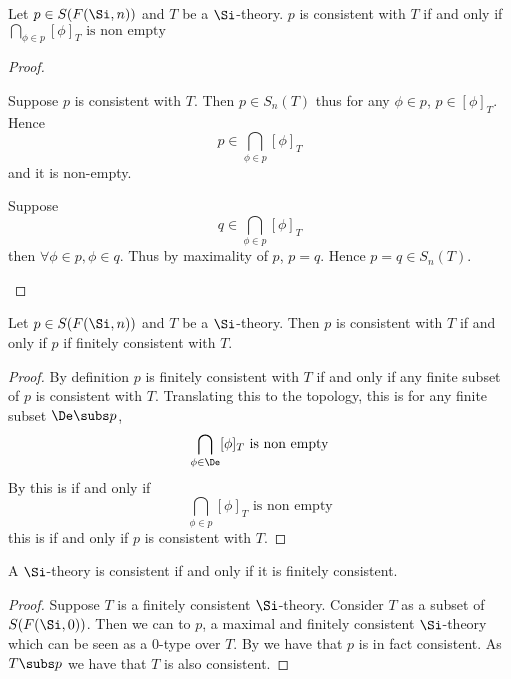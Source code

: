 \begin{lem}
    Let $p \in S(F(\Si,n))$ and $T$ be a $\Si$-theory.
    $p$ is consistent with $T$ if and only if 
    $\bigcap_{\phi \in p} [\phi]_T \text{ is non empty}$
\end{lem}
\begin{proof}
    \begin{forward}
        Suppose $p$ is consistent with $T$.
        Then $p \in S_n(T)$ thus for any $\phi \in p$, 
        $p \in [\phi]_T$. 
        Hence 
        \[ p \in \bigcap_{\phi \in p} [\phi]_T\]
    and it is non-empty.
    \end{forward}

    \begin{backward}
        Suppose 
        \[q \in \bigcap_{\phi \in p} [\phi]_T\]
        then $\forall \phi \in p, \phi \in q$.
        Thus by maximality of $p$, $p = q$.
        Hence $p = q \in S_n(T)$.
    \end{backward}
\end{proof}

\begin{prop}
    Let $p \in S(F(\Si,n))$ and $T$ be a $\Si$-theory.
    Then $p$ is consistent with $T$ if and only if $p$ if finitely consistent
    with $T$.
\end{prop}
\begin{proof}
    By definition $p$ is finitely consistent with $T$ if and only if 
    any finite subset of $p$ is consistent with $T$.
    Translating this to the topology, this is
    for any finite subset $\De \subs p$,
    \[\bigcap_{\phi \in \De} [\phi]_T \text{ is non empty}\]
    By  
    this is if and only if 
    \[\bigcap_{\phi \in p} [\phi]_T \text{ is non empty}\]
    this is if and only if $p$ is consistent with $T$.
\end{proof}

\begin{prop}[Compactness]
    A $\Si$-theory is consistent if and only if it is finitely consistent.
\end{prop}
\begin{proof}
    Suppose $T$ is a finitely consistent $\Si$-theory.
    Consider $T$ as a subset of $S(F(\Si,0))$.
    Then we can  to $p$, 
    a maximal and finitely consistent 
    $\Si$-theory which can be seen as a $0$-type over $T$.
    By  we have that 
    $p$ is in fact consistent.
    As $T \subs p$ we have that $T$ is also consistent.
\end{proof}